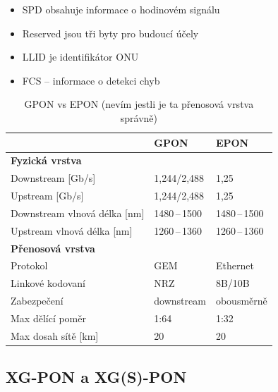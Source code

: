 \begin{itemize}
    \item SPD obsahuje informace o hodinovém signálu
    \item Reserved jsou tři byty pro budoucí účely
    \item LLID je identifikátor ONU
    \item FCS -- informace o detekci chyb
\end{itemize}

\clearpage

\begin{table}[ht]
    \centering
    \caption{GPON vs EPON (nevím jestli je ta přenosová vrstva správně)}
    \begin{tabular}{|l|l|l|}
        \hline
                                     & GPON           & EPON           \\\hline\hline
        \textbf{Fyzická vrstva}      &                &                \\\hline\hline
        Downstream [Gb/s]            & 1,244/2,488    & 1,25           \\\hline
        Upstream [Gb/s]              & 1,244/2,488    & 1,25           \\\hline
        Downstream vlnová délka [nm] & 1480\,--\,1500 & 1480\,--\,1500 \\\hline
        Upstream vlnová délka [nm]   & 1260\,--\,1360 & 1260\,--\,1360 \\\hline\hline
        \textbf{Přenosová vrstva}    &                &                \\\hline\hline
        Protokol                     & GEM            & Ethernet       \\\hline
        Linkové kodovaní             & NRZ            & 8B/10B         \\\hline
        Zabezpečení                  & downstream     & obousměrně     \\\hline
        Max dělící poměr             & 1:64           & 1:32           \\\hline
        Max dosah sítě [km]          & 20             & 20             \\\hline
    \end{tabular}
\end{table}

\subsection{XG-PON a XG(S)-PON}

